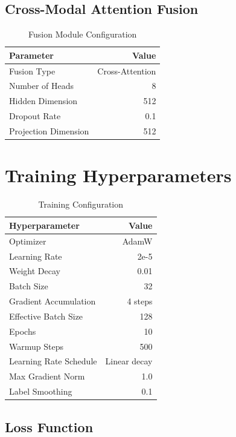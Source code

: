 \documentclass[10pt,a4paper]{article}
\begin{document}
\subsection{Cross-Modal Attention Fusion}

\begin{table}[h]
\centering
\caption{Fusion Module Configuration}
\begin{tabular}{lr}
\toprule
\rowcolor{headerblue}
\textbf{Parameter} & \textbf{Value} \\
\midrule
Fusion Type             & Cross-Attention \\
Number of Heads         & 8 \\
Hidden Dimension        & 512 \\
Dropout Rate            & 0.1 \\
Projection Dimension    & 512 \\
\bottomrule
\end{tabular}
\end{table}

\section{Training Hyperparameters}

\begin{table}[h]
\centering
\caption{Training Configuration}
\begin{tabular}{lr}
\toprule
\rowcolor{headerblue}
\textbf{Hyperparameter} & \textbf{Value} \\
\midrule
Optimizer               & AdamW \\
Learning Rate           & 2e-5 \\
Weight Decay            & 0.01 \\
Batch Size              & 32 \\
Gradient Accumulation   & 4 steps \\
Effective Batch Size    & 128 \\
Epochs                  & 10 \\
Warmup Steps            & 500 \\
Learning Rate Schedule  & Linear decay \\
Max Gradient Norm       & 1.0 \\
Label Smoothing         & 0.1 \\
\bottomrule
\end{tabular}
\end{table}

\subsection{Loss Function}
\end{document}

